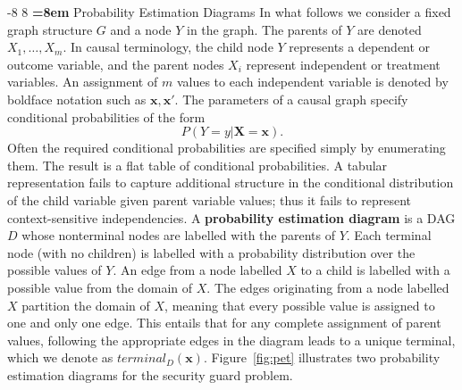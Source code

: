 \documentclass{elsarticle}%
\makeatletter
\renewcommand\subsection{\@startsection {subsection}{1}{\z@}%
  {-8\p@ \@plus -4\p@ \@minus -4\p@}%
                       {8\p@ \@plus 4\p@ \@minus 4\p@}%
                                   {\normalfont\large\bfseries\boldmath
                                   \rightskip=\z@ \@plus 8em\pretolerance=10000 }}
\newcommand{\X}{X}
\newcommand{\Y}{Y}
\newcommand{\G}{G}
\newcommand{\y}{y}
\newcommand{\tree}{D}
\newcommand{\leaf}{\mathit{terminal}}
\newcommand{\parentval}{x}
\newcommand{\parentvals}{\mathbf{\parentval}}
\newcommand{\numparents}{m}
\newcommand{\childvar}{\Y}
\newcommand{\childvarvalue}{\y}
\newcommand{\parentvar}{\X}
\newcommand{\parentvars}{\mathbf{\parentvar}}
\makeatother
\begin{document}
\subsection{Probability Estimation Diagrams} 
 In what follows we consider a fixed graph structure $\G$ and a node $\childvar$ in the graph. The parents of $\childvar$ are denoted $\parentvar_{1},\ldots,\parentvar_{\numparents}$. 
In causal terminology, the child node $\childvar$ represents a dependent or outcome variable, 
and the parent nodes $\parentvar_{i}$ represent independent or treatment variables. 
 An assignment of $\numparents$ values to each independent variable is denoted by boldface notation such as $\parentvals,\parentvals'$. The parameters of a causal graph specify conditional probabilities of the form
 $$P(\childvar = \childvarvalue|\parentvars = \parentvals).$$ Often the required conditional probabilities are specified simply by enumerating them. The result is a flat table of conditional probabilities.  A tabular representation fails to capture additional structure in the conditional distribution of the child variable given parent variable values; thus it fails to represent context-sensitive independencies.  A \textbf{probability estimation diagram} is a DAG $\tree$ whose nonterminal nodes are labelled with the parents of $\childvar$. Each terminal node (with no children) is labelled with a probability distribution over the possible values of $\childvar$.  An edge from a node labelled $\parentvar$ to a child is labelled with a possible value from the domain of $\parentvar$. The edges originating from a node labelled $\parentvar$ partition the domain of $\parentvar$, meaning that every possible value is assigned to one and only one edge. This entails that for any complete assignment of parent values, following the appropriate edges in the diagram leads to a unique terminal, which we denote as $\leaf_{\tree}(\parentvals)$. Figure~\ref{fig:pet} illustrates two probability estimation diagrams for the security guard problem. 
 
\end{document}
